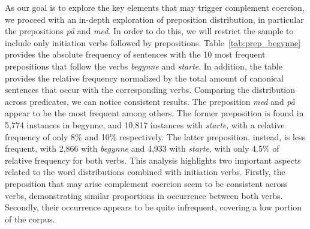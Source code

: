 \documentclass{article}
\begin{document}
                    

As our goal is to explore the key elements that may trigger complement coercion, we proceed with an in-depth exploration of preposition distribution, in particular the prepositions \emph{på} and \emph{med}. In order to do this, we will restrict the sample to include only initiation verbs followed by prepositions.
Table~\ref{tab:prep_begynne} provides the absolute frequency of sentences with the 10 most frequent prepositions that follow the verbs \emph{begynne} and \emph{starte}. 
In addition, the table provides the relative frequency normalized by the total amount of canonical sentences that occur with the corresponding verbs. Comparing the distribution across predicates, we can notice consistent results. 
The preposition \emph{med} and \emph{på} appear to be the most frequent among others. The former preposition is found in 5,774 instances in begynne, and 10,817 instances with \emph{starte}, with a relative frequency of only 8\% and 10\% respectively. The latter preposition, instead, is less frequent, with 2,866 with \emph{begynne} and 4,933 with \emph{starte}, with only 4.5\% of relative frequency for both verbs. This analysis highlights two important aspects related to the word distributions combined with initiation verbs. Firstly, the preposition that may arise complement coercion seem to be consistent across verbs, demonstrating similar proportions in occurrence between both verbs. Secondly, their occurrence appears to be quite infrequent, covering a low portion of the corpus.   
\end{document}
